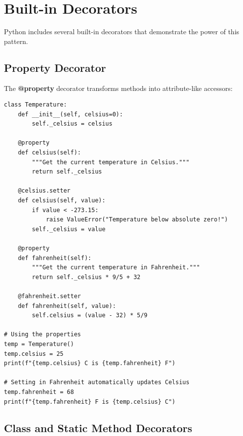 \documentclass[12pt,letterpaper]{article}
\newenvironment{macterminal}{%
    \begin{mdframed}[
        linecolor=terminalFrame,
        backgroundcolor=terminalBg,
        roundcorner=5pt,
        skipabove=10pt,
        skipbelow=10pt,
        linewidth=1pt,
        innertopmargin=10pt, %
        frametitle={%
            \tikz[baseline=(current bounding box.east), outer sep=0pt]{
                \fill[red!80!black] (0,0) circle (5pt);
                \fill[yellow!80!black] (0.7,0) circle (5pt);
                \fill[green!70!black] (1.4,0) circle (5pt);
            }
        },
        frametitlealignment=\raggedright, %
        frametitleaboveskip=8pt, %
        frametitlebelowskip=0pt, %
    ]
}{%
    \end{mdframed}%
}
\begin{document}
\section{Built-in Decorators}

Python includes several built-in decorators that demonstrate the power of this pattern.

\subsection{Property Decorator}

The \textbf{\textcolor{accentColor}{@property}} decorator transforms methods into attribute-like accessors:

\begin{macterminal}
\begin{lstlisting}
class Temperature:
    def __init__(self, celsius=0):
        self._celsius = celsius
        
    @property
    def celsius(self):
        """Get the current temperature in Celsius."""
        return self._celsius
        
    @celsius.setter
    def celsius(self, value):
        if value < -273.15:
            raise ValueError("Temperature below absolute zero!")
        self._celsius = value
        
    @property
    def fahrenheit(self):
        """Get the current temperature in Fahrenheit."""
        return self._celsius * 9/5 + 32
        
    @fahrenheit.setter
    def fahrenheit(self, value):
        self.celsius = (value - 32) * 5/9

# Using the properties
temp = Temperature()
temp.celsius = 25
print(f"{temp.celsius} C is {temp.fahrenheit} F")

# Setting in Fahrenheit automatically updates Celsius
temp.fahrenheit = 68
print(f"{temp.fahrenheit} F is {temp.celsius} C")
\end{lstlisting}
\end{macterminal}

\subsection{Class and Static Method Decorators}
\end{document}
